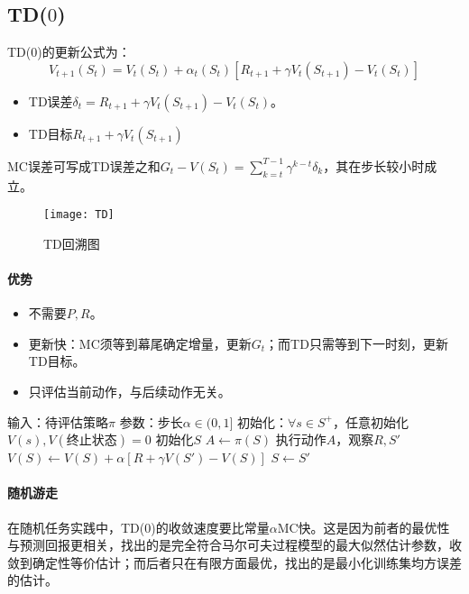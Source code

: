 \documentclass[
12pt, %
a4paper, 
oneside, %
headinclude,footinclude, %
]{scrartcl}
\begin{document}
\subsection[TD($ 0 $)]{TD($ 0 $)}
TD($ 0 $)的更新公式为：
$$ V_{t + 1}(S_t) = V_t(S_t) + \alpha_t(S_t)[R_{t + 1} + \gamma V_t(S_{t + 1}) - V_t(S_t)] $$
\begin{itemize}
\item TD误差$ \delta_t = R_{t + 1} + \gamma V_t(S_{t + 1}) - V_t(S_t) $。
\item TD目标$ R_{t + 1} + \gamma V_t(S_{t + 1}) $
\end{itemize}

MC误差可写成TD误差之和$ G_t - V(S_t) = \sum_{k = t}^{T - 1} \gamma^{k - t} \delta_k $，其在步长较小时成立。

\begin{figure}[H]
\centering
\texttt{[image: TD]}
\caption[TD回溯图]{TD回溯图}
\end{figure}
\paragraph{优势}
\begin{itemize}
\item 不需要$ P,R $。
\item 更新快：MC须等到幕尾确定增量，更新$ G_t $；而TD只需等到下一时刻，更新TD目标。
\item 只评估当前动作，与后续动作无关。
\end{itemize}
\begin{myalgorithm}[TD($ 0 $)]
\State 输入：待评估策略$ \pi $
\State 参数：步长$ \alpha \in (0,1] $
\State 初始化：$ \forall s \in S^+ $，任意初始化$ V(s), V(\text{终止状态}) = 0 $
\State 初始化$ S $
\State $ A \gets \pi(S) $
\State 执行动作$ A $，观察$ R, S' $
\State $ V(S) \gets V(S) + \alpha[R + \gamma V(S') - V(S)] $
\State $ S \gets S' $
\EndWhile
\EndFor
\end{myalgorithm}
\paragraph{随机游走}
在随机任务实践中，TD($ 0 $)的收敛速度要比常量$ \alpha $MC快。这是因为前者的最优性与预测回报更相关，找出的是完全符合马尔可夫过程模型的最大似然估计参数，收敛到确定性等价估计；而后者只在有限方面最优，找出的是最小化训练集均方误差的估计。
\end{document}
